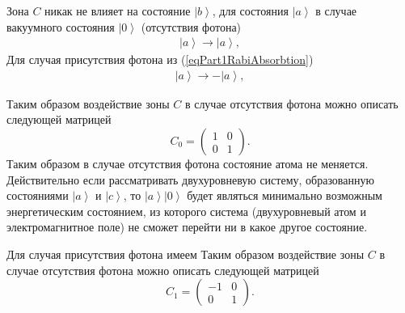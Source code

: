 Зона $C$ никак не влияет на состояние $\left|b\right>$, для состояния
$\left|a\right>$ в случае вакуумного состояния $\left|0\right>$
(отсутствия фотона)
\begin{eqnarray}
  \left|a\right> \rightarrow \left|a\right>,
  \nonumber
\end{eqnarray}
Для случая присутствия фотона из (\ref{eqPart1RabiAbsorbtion})
\begin{eqnarray}
  \left|a\right> \rightarrow -\left|a\right>,
  \nonumber
\end{eqnarray}

Таким образом воздействие зоны $C$ в случае отсутствия фотона можно
описать следующей матрицей
\[
C_0 = \left(
\begin{array} {cc}
1 & 0
\\
0 & 1 
\end{array}
\right).
\]
Таким образом в случае отсутствия фотона состояние атома не
меняется. Действительно если рассматривать двухуровневую систему,
образованную состояниями $\left|a\right>$ и $\left|c\right>$, то
$\left|a\right>\left|0\right>$ будет являться минимально возможным
энергетическим состоянием, из которого система (двухуровневый атом и
электромагнитное поле) не сможет перейти ни в
какое другое состояние.

Для случая присутствия фотона имеем
Таким образом воздействие зоны $C$ в случае отсутствия фотона можно
описать следующей матрицей
\[
C_1 = \left(
\begin{array} {cc}
-1 & 0
\\
0 & 1 
\end{array}
\right).
\]

